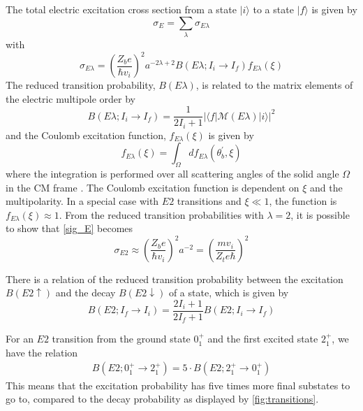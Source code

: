 \documentclass[twoside,english]{uiofysmaster/uiofysmaster}
\let\orgautoref\autoref
\renewcommand{\autoref}
        {%
		 \def\sectionautorefname{Section}%
		 \def\subsectionautorefname{Section}%
		 \def\subsubsectionautorefname{Section}%
		 \def\chapterautorefname{Chapter}%
          \orgautoref}
\begin{document}
The total electric excitation cross section from a state $|i\rangle$ to a state $|f\rangle$ is given by
\begin{equation}\label{tot_sig_E}
	\sigma_E = \sum_\lambda \sigma_{E \lambda}
\end{equation}
with
\begin{equation}\label{sig_E}
	\sigma_{E \lambda} = \left( \frac{Z_b e}{\hbar v_i} \right)^2 a^{-2 \lambda + 2} B(E \lambda; I_i \rightarrow I_f) f_{E \lambda} (\xi)
\end{equation}
The reduced transition probability, $B(E \lambda)$, is related to the matrix elements of the electric multipole order by
\begin{equation}
	B(E \lambda; I_i \rightarrow I_f) = \frac{1}{2I_i + 1} | \langle f | \mathcal{M}(E \lambda)| i \rangle |^2 
\end{equation}
and the Coulomb excitation function, $f_{E \lambda} (\xi)$ is given by
\begin{equation}
	f_{E \lambda} (\xi) = \int_\Omega df_{E \lambda} (\theta_b^{'}, \xi)
\end{equation}
where the integration is performed over all scattering angles of the solid angle $\Omega$ in the CM frame \cite{Niedermaier, EE-Coulex}.
The Coulomb excitation function is dependent on $\xi$ and the multipolarity. 
In a special case with $E2$ transitions and $\xi \ll 1$, the function is $f_{E \lambda} (\xi) \approx 1$.
From the reduced transition probabilities with $\lambda = 2$, it is possible to show that \autoref{sig_E} becomes \cite{NaR}
\begin{equation}
	\sigma_{E2} \approx \left( \frac{Z_b e}{\hbar v_i} \right)^2 a^{-2} = \left( \frac{mv_i}{Z_t e\hbar} \right)^2
\end{equation}

There is a relation of the reduced transition probability between the excitation $B(E2 \uparrow)$ and the decay $B(E2 \downarrow)$ of a state, which is given by 
\begin{equation}
	B(E2; I_f \rightarrow I_i) = \frac{2I_i + 1}{2I_f + 1} B(E2; I_i \rightarrow I_f)
\end{equation}

For an $E2$ transition from the ground state $0_1^+$ and the first excited state $2_1^+$, we have the relation
\begin{align}
	B(E2; 0_1^+ \rightarrow 2_1^+) = 5 \cdot B(E2; 2_1^+ \rightarrow 0_1^+)
\end{align} 
This means that the excitation probability has five times more final substates to go to, compared to the decay probability as displayed by \autoref{fig:transitions}.
\end{document}
